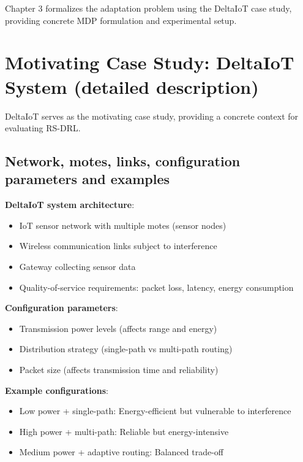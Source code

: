 \documentclass[11pt,a4paper]{article}
\begin{document}
Chapter 3 formalizes the adaptation problem using the DeltaIoT case study, providing concrete MDP formulation and experimental setup.

\newpage


\setcounter{section}{0}
\renewcommand{\thesection}{3.\arabic{section}}
\renewcommand{\thesubsection}{3.\arabic{section}.\arabic{subsection}}
\renewcommand{\thesubsubsection}{3.\arabic{section}.\arabic{subsection}.\arabic{subsubsection}}

\section{Motivating Case Study: DeltaIoT System (detailed description)}

DeltaIoT serves as the motivating case study, providing a concrete context for evaluating RS-DRL.

\subsection{Network, motes, links, configuration parameters and examples}

\textbf{DeltaIoT system architecture}:
\begin{itemize}
    \item IoT sensor network with multiple motes (sensor nodes)
    \item Wireless communication links subject to interference
    \item Gateway collecting sensor data
    \item Quality-of-service requirements: packet loss, latency, energy consumption
\end{itemize}

\textbf{Configuration parameters}:
\begin{itemize}
    \item Transmission power levels (affects range and energy)
    \item Distribution strategy (single-path vs multi-path routing)
    \item Packet size (affects transmission time and reliability)
\end{itemize}

\textbf{Example configurations}:
\begin{itemize}
    \item Low power + single-path: Energy-efficient but vulnerable to interference
    \item High power + multi-path: Reliable but energy-intensive
    \item Medium power + adaptive routing: Balanced trade-off
\end{itemize}
\end{document}
